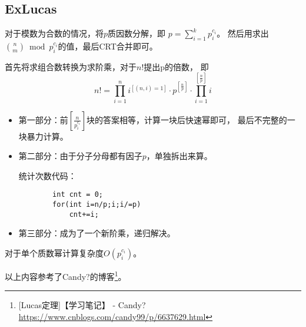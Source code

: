 \subsection{ExLucas}
对于模数为合数的情况，将$p$质因数分解，即
$\displaystyle p=\sum_{i=1}^k{p_i^{c_i}}$。
然后用求出${n \choose m} \bmod{p_i^{c_i}}$的值，最后CRT合并即可。

首先将求组合数转换为求阶乘，对于$n!$提出p的倍数，
即\begin{displaymath}
	n!=\prod_{i=1}^n{i^{[(n,i)=1]}}\cdot p^{[\frac{n}{p}]}\cdot
	\prod_{i=1}^{[\frac{n}{p}]}i
\end{displaymath}
\begin{itemize}
	\item 第一部分：前$[\frac{n}{p_i^{c_i}}]$块的答案相等，计算一块后快速幂即可，
	      最后不完整的一块暴力计算。
	\item 第二部分：由于分子分母都有因子$p$，单独拆出来算。

	统计次数代码：
	\begin{lstlisting}
		int cnt = 0;
		for(int i=n/p;i;i/=p)
			cnt+=i;
	\end{lstlisting}
	\item 第三部分：成为了一个新阶乘，递归解决。
\end{itemize}
对于单个质数幂计算复杂度$O(p_i^{c_i})$。

以上内容参考了Candy?的博客\footnote{[Lucas定理]【学习笔记】 - Candy?
	\url{https://www.cnblogs.com/candy99/p/6637629.html}}。
